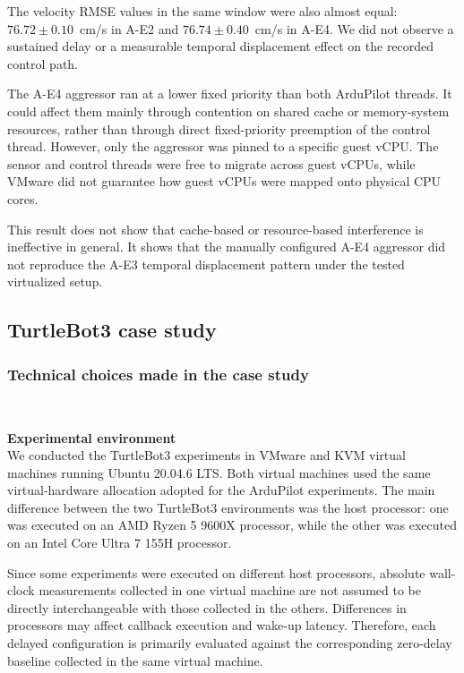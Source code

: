 \noindent The velocity RMSE values in the same window were also almost equal:
\(76.72 \pm 0.10\)~cm/s in A-E2 and
\(76.74 \pm 0.40\)~cm/s in A-E4. We did not observe a
sustained delay or a measurable temporal displacement effect on the
recorded control path.

\noindent The A-E4 aggressor ran at a lower fixed priority than both ArduPilot threads. It could affect them mainly through contention on shared cache or memory-system resources, rather than through direct fixed-priority preemption of the control thread. However, only the aggressor was pinned to a specific guest vCPU. The sensor and control threads were free to migrate across guest vCPUs, while VMware did not guarantee how guest vCPUs were mapped onto physical CPU cores.

\noindent This result does not show that cache-based or resource-based
interference is ineffective in general. It shows that the manually
configured A-E4 aggressor did not reproduce the A-E3
temporal displacement pattern under the tested virtualized setup.


\subsection{TurtleBot3 case study}
\subsubsection{Technical choices made in the case study} \\
\leavevmode\par
\noindent \textbf{Experimental environment} \\
We conducted the TurtleBot3 experiments in VMware and KVM virtual machines running Ubuntu 20.04.6 LTS. Both virtual machines used the same virtual-hardware allocation adopted for the ArduPilot experiments. The main difference between the two TurtleBot3 environments was the host processor: one was executed on an AMD Ryzen 5 9600X processor, while the other was executed on an Intel Core Ultra 7 155H processor.

\noindent Since some experiments were executed on different host processors, absolute
wall-clock measurements collected in one virtual machine are not assumed to
be directly interchangeable with those collected in the others. Differences in processors may affect callback execution and wake-up latency. Therefore, each delayed configuration is primarily evaluated against the corresponding zero-delay baseline collected in the same virtual machine.

